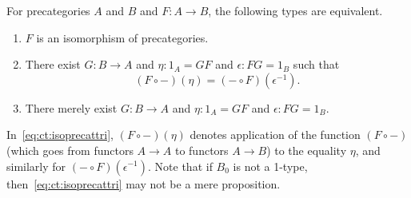\documentclass{mscs}
\newcommand{\opp}[1]{\mathord{{#1}^{-1}}}
\newcommand{\map}[2]{\ensuremath{{#1}\left({#2}\right)}\xspace}
\numberwithin{equation}{section}
\begin{document}
\begin{lem}\label{ct:isoprecat}
  For precategories $A$ and $B$ and $F:A\to B$, the following types are equivalent.
  \begin{enumerate}
  \item $F$ is an isomorphism of precategories.\label{item:ct:ipc1}
  \item There exist $G:B\to A$ and $\eta:1_A = GF$ and $\epsilon:FG=1_B$ such that\label{item:ct:ipc2}
    \begin{equation}
      \map{(F\circ -)}{\eta} = \map{(-\circ F)}{\opp\epsilon}.\label{eq:ct:isoprecattri}
    \end{equation}
  \item There merely exist $G:B\to A$ and $\eta:1_A = GF$ and $\epsilon:FG=1_B$.\label{item:ct:ipc3}
  \end{enumerate}
\end{lem}

In~\eqref{eq:ct:isoprecattri}, $\map{(F\circ -)}{\eta}$ denotes application of the function $(F\circ -)$ (which goes from functors $A\to A$ to functors $A\to B$) to the equality $\eta$, and similarly for $\map{(-\circ F)}{\opp\epsilon}$.
Note that if $B_0$ is not a 1-type, then~\eqref{eq:ct:isoprecattri} may not be a mere proposition.
\end{document}
